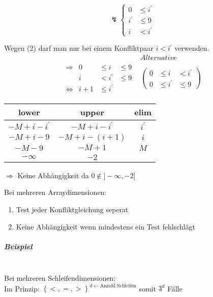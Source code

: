 \[
\lightning \left\{
\begin{array}{rl}
	0 &\leq i^\prime \\
	i^\prime &\leq 9 \\
	i &< i^\prime
\end{array}
\right.
\]

Wegen (2) darf man nur bei einem Konfliktpaar \( i < i^\prime \) verwenden.
\[
\begin{array}{lr}
 & Alternative \\

\begin{array}{cccc}
	\Rightarrow & 0 & \leq i & \leq 9 \\
	 & i & < i^\prime & \leq 9  \\
	\Leftrightarrow & i + 1 & \leq i^\prime &
\end{array}
&
\left(
\begin{array}{ccc}
0 & \leq i & < i^\prime \\
0 & \leq i^\prime & \leq 9
\end{array}
\right)
\end{array}
\]

\begin{center}
\begin{tabular}{c|c|c}
lower & upper & elim \\
\hline
\( -M + i - i^\prime \) & \( -M+i-i^\prime\) & \(i^\prime \) \\
\hline
\( -M+ i - 9 \) & \( -M + i -(i+1) \) & \( i \) \\
\hline
\(-M -9 \) & \( -M +1 \) & \( M \) \\
\hline
\( -\infty \) & \(-2\) & \\
\end{tabular}
\end{center}

\( \Rightarrow \) Keine Abhängigkeit da \( 0 \notin ] - \infty , -2 ] \)

Bei mehreren Arraydimensionen:
 \begin{enumerate}
	\item Test jeder Konfliktgleichung seperat
	\item Keine Abhängigkeit wenn mindestens ein Test fehlschlägt
\end{enumerate}

\subparagraph{Beispiel}~\\
Bei mehreren Schleifendimensionen:\\
Im Prinzip: \(\left\{ <, =, > \right\} ^{d \leftarrow \text{Anzahl Schleifen}} \) somit \(3^d\) Fälle


